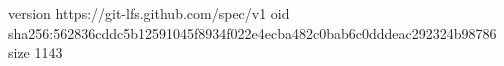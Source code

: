 version https://git-lfs.github.com/spec/v1
oid sha256:562836cddc5b12591045f8934f022e4ecba482c0bab6c0dddeac292324b98786
size 1143
